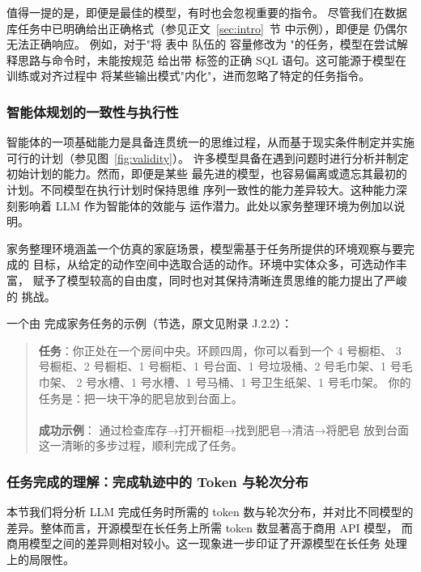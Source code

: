 值得一提的是，即便是最佳的模型，有时也会忽视重要的指令。
尽管我们在数据库任务中已明确给出正确格式（参见正文~\ref{sec:intro}~节
中示例），即便是  仍偶尔无法正确响应。
例如，对于"将  表中  队伍的
容量修改为 "的任务，模型在尝试解释思路与命令时，未能按规范
给出带  标签的正确 SQL 语句。这可能源于模型在训练或对齐过程中
将某些输出模式"内化"，进而忽略了特定的任务指令。

\subsubsection{智能体规划的一致性与执行性}

智能体的一项基础能力是具备连贯统一的思维过程，从而基于现实条件制定并实施
可行的计划（参见图~\ref{fig:validity}）。
许多模型具备在遇到问题时进行分析并制定初始计划的能力。然而，即便是某些
最先进的模型，也容易偏离或遗忘其最初的计划。不同模型在执行计划时保持思维
序列一致性的能力差异较大。这种能力深刻影响着 LLM 作为智能体的效能与
运作潜力。此处以家务整理环境为例加以说明。

家务整理环境涵盖一个仿真的家庭场景，模型需基于任务所提供的环境观察与要完成的
目标，从给定的动作空间中选取合适的动作。环境中实体众多，可选动作丰富，
赋予了模型较高的自由度，同时也对其保持清晰连贯思维的能力提出了严峻的
挑战。

一个由  完成家务任务的示例（节选，原文见附录 J.2.2）：
\begin{quote}\small\ttfamily
\textbf{任务}：你正处在一个房间中央。环顾四周，你可以看到一个 4 号橱柜、
3 号橱柜、2 号橱柜、1 号橱柜、1 号台面、1 号垃圾桶、2 号毛巾架、1 号毛巾架、
2 号水槽、1 号水槽、1 号马桶、1 号卫生纸架、1 号毛巾架。
你的任务是：把一块干净的肥皂放到台面上。\\
\\
\textbf{成功示例}： 通过检查库存→打开橱柜→找到肥皂→清洁→将肥皂
放到台面这一清晰的多步过程，顺利完成了任务。
\end{quote}

\subsubsection{任务完成的理解：完成轨迹中的 Token 与轮次分布}

本节我们将分析 LLM 完成任务时所需的 token 数与轮次分布，并对比不同模型的
差异。整体而言，开源模型在长任务上所需 token 数显著高于商用 API 模型，
而商用模型之间的差异则相对较小。这一现象进一步印证了开源模型在长任务
处理上的局限性。

